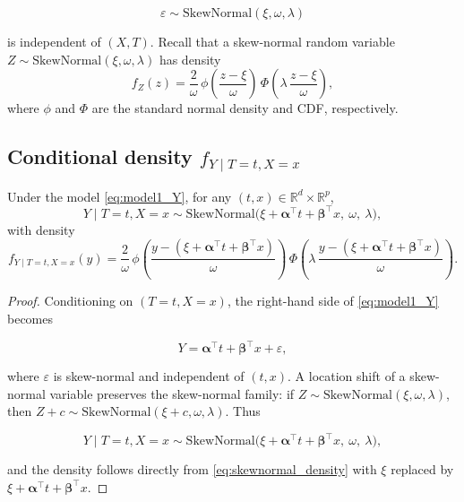 \documentclass[11pt]{article}
\begin{document}
\[
\varepsilon \sim \mathrm{SkewNormal}(\xi, \omega, \lambda)
\]


is independent of $(X,T)$.
Recall that a skew-normal random variable $Z \sim \mathrm{SkewNormal}(\xi, \omega, \lambda)$ has density
\begin{equation}
    f_Z(z)
    = \frac{2}{\omega}\, \phi\!\left(\frac{z-\xi}{\omega}\right)\,
      \Phi\!\left(\lambda\, \frac{z-\xi}{\omega}\right),
    \label{eq:skewnormal_density}
\end{equation}
where $\phi$ and $\Phi$ are the standard normal density and CDF, respectively.

\subsection{Conditional density $f_{Y \mid T=t, X=x}$}

\begin{theorem}
Under the model \eqref{eq:model1_Y}, for any $(t,x) \in \mathbb{R}^d \times \mathbb{R}^p$,
\begin{equation}
    Y \mid T=t, X=x \sim \mathrm{SkewNormal}\big(\xi + \bm{\alpha}^\top t + \bm{\beta}^\top x,\ \omega,\ \lambda\big),
    \label{eq:model1_conditional_law}
\end{equation}
with density
\begin{equation}
    f_{Y \mid T=t, X=x}(y)
    = \frac{2}{\omega}\,
      \phi\!\left(\frac{y - (\xi + \bm{\alpha}^\top t + \bm{\beta}^\top x)}{\omega}\right)\,
      \Phi\!\left(\lambda\, \frac{y - (\xi + \bm{\alpha}^\top t + \bm{\beta}^\top x)}{\omega}\right).
    \label{eq:model1_conditional_density}
\end{equation}
\end{theorem}

\begin{proof}
Conditioning on $(T=t,X=x)$, the right-hand side of \eqref{eq:model1_Y} becomes


\[
Y = \bm{\alpha}^\top t + \bm{\beta}^\top x + \varepsilon,
\]


where $\varepsilon$ is skew-normal and independent of $(t,x)$.
A location shift of a skew-normal variable preserves the skew-normal family:
if $Z \sim \mathrm{SkewNormal}(\xi,\omega,\lambda)$, then $Z + c \sim \mathrm{SkewNormal}(\xi + c,\omega,\lambda)$.
Thus


\[
Y \mid T=t,X=x \sim \mathrm{SkewNormal}\big(\xi + \bm{\alpha}^\top t + \bm{\beta}^\top x,\ \omega,\ \lambda\big),
\]


and the density follows directly from \eqref{eq:skewnormal_density} with $\xi$ replaced by $\xi + \bm{\alpha}^\top t + \bm{\beta}^\top x$.
\end{proof}
\end{document}
